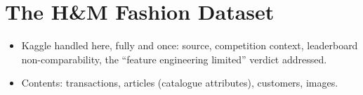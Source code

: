 \section{The H\&M Fashion Dataset}
\label{sec:data-hm}
\begin{itemize}
    \item Kaggle handled here, fully and once: source, competition context, leaderboard non-comparability, the ``feature engineering limited'' verdict addressed. 
    \item Contents: transactions, articles (catalogue attributes), customers, images.

\end{itemize}
